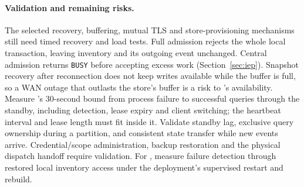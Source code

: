 \paragraph{Validation and remaining risks.}
The selected recovery, buffering, mutual TLS and store-provisioning mechanisms
still need timed recovery and load tests. Full \Outbox admission rejects the whole
local transaction, leaving inventory and its outgoing event unchanged. Central admission
returns \texttt{BUSY} before accepting excess work (Section~\ref{sec:iep}). Snapshot
recovery after reconnection does not keep writes available while the buffer is full,
so a WAN outage that outlasts the store's buffer is a risk to 's availability.
Measure 's 30-second bound from process failure to successful queries
through the standby, including detection, lease expiry and client switching; the
heartbeat interval and lease length must fit inside it. Validate standby lag, exclusive query
ownership during a partition, and consistent state transfer while new events arrive.
Credential/scope administration, backup restoration and the physical dispatch handoff
require validation. For , measure failure detection through restored local
inventory access under the deployment's supervised restart and rebuild.
